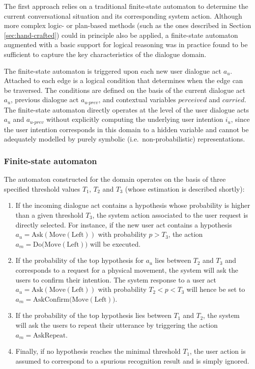 The first approach relies on a traditional finite-state automaton to determine the current conversational situation and its corresponding system action.  Although more complex logic- or plan-based methods (such as the ones described in Section \ref{sec:hand-crafted}) could in principle also be applied, a finite-state automaton augmented with a basic support for logical reasoning was in practice found to be sufficient to capture the key characteristics of the dialogue domain. 

The finite-state automaton is triggered upon each new user dialogue act $a_u$. Attached to each edge is a logical condition that determines when the edge can be traversed. The conditions are defined on the basis of the current dialogue act $a_u$, previous dialogue act $a_{u\mbox{-}prev}$, and contextual variables $\mathit{perceived}$ and $\mathit{carried}$. The finite-state automaton directly operates at the level of the user dialogue acts $a_u$ and $a_{u\mbox{-}prev}$ without explicitly computing the underlying user intention $i_u$, since the user intention corresponds in this domain to a hidden variable and cannot be adequately modelled by purely symbolic (i.e.\ non-probabilistic) representations. 

\subsubsection*{Finite-state automaton}

The automaton constructed for the domain operates on the basis of three specified threshold values $T_1$, $T_2$ and $T_3$ (whose estimation is described shortly):
\begin{enumerate}
\item If the incoming dialogue act contains a hypothesis whose probability is higher than a given threshold $T_3$, the system action associated to the user request is directly selected.  For instance, if the new user act contains a hypothesis $a_u = \mathrm{Ask(Move(Left))}$ with probability $p > T_3$, the action $a_m = \mathrm{Do(Move(Left)})$ will be executed.
\item If the probability of the top hypothesis for $a_u$ lies between $T_2$ and $T_3$ and corresponds to a request for a physical movement, the system will ask the users to confirm their intention.  The system response to a user act $a_u = \mathrm{Ask(Move(Left))}$ with probability $T_2 < p < T_3$ will hence be set to $a_m = \mathrm{AskConfirm(Move(Left)})$.
\item If the probability of the top hypothesis lies between $T_1$ and $T_2$, the system will ask the users to repeat their utterance by triggering the action $a_m = \mathrm{AskRepeat}$. 
\item Finally, if no hypothesis reaches the minimal threshold $T_1$, the user action is assumed to correspond to a spurious recognition result and is simply ignored.
\end{enumerate}

